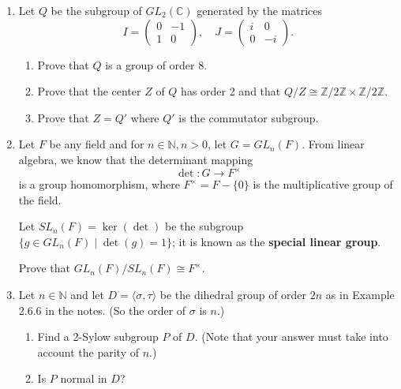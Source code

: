\documentclass{article}
\begin{document}
\begin{enumerate}
\item Let $ Q $ be the subgroup of $ GL_2(\mathbb{C}) $ generated by the matrices
  $$I = \begin{pmatrix} 0 & -1 \\ 1 & 0 \end{pmatrix}, \quad J = \begin{pmatrix} i & 0 \\ 0 & -i \end{pmatrix}.$$
  \begin{enumerate}
  \item Prove that $ Q $ is a group of order 8.
  \item Prove that the center $ Z $ of $ Q $ has order 2 and that $ Q / Z \cong \mathbb{Z}/2\mathbb{Z} \times \mathbb{Z}/2\mathbb{Z} $.

  \item Prove that $ Z = Q' $ where $ Q' $ is the commutator subgroup.
  \end{enumerate}

\item Let $ F $ be any field and for $ n \in \mathbb{N}, n > 0 $, let $ G = GL_n(F) $.
  From linear algebra, we know that the determinant mapping 
  $$\det: G \to F^\times$$
  is a group homomorphism, where $ F^\times = F - \{0\} $ is the multiplicative group of the field.

  Let $ SL_n(F) = \ker(\det) $ be the subgroup $ \{ g \in GL_n(F) \mid \det(g) = 1 \} $; it is known as the \textbf{special linear group}.

  Prove that $ GL_n(F) / SL_n(F) \cong F^\times $.


\item Let $ n \in \mathbb{N} $ and let $ D = \langle \sigma, \tau \rangle $ be the dihedral group of order $ 2n $ as in Example 2.6.6 in the notes. (So the order of $ \sigma $ is $ n $.)
  \begin{enumerate}
  \item Find a 2-Sylow subgroup $ P $ of $ D $. (Note that your answer must take into account the parity of $ n $.)
  \item Is $ P $ normal in $ D $?
  \end{enumerate}
\end{enumerate}
\end{document}
